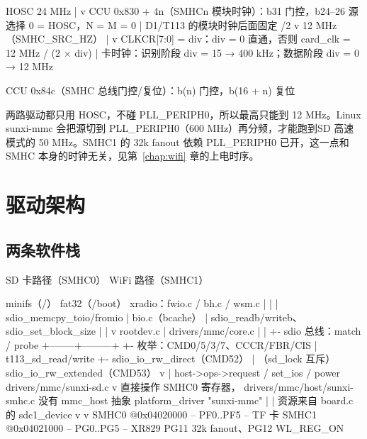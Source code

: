 \begin{txtcode}
HOSC 24 MHz
  |
  v  CCU 0x830 + 4n（SMHCn 模块时钟）：b31 门控，b24–26 源选择 0 = HOSC，N = M = 0
  |  D1/T113 的模块时钟后面固定 /2
  v
12 MHz（SMHC_SRC_HZ）
  |
  v  CLKCR[7:0] = div：div = 0 直通，否则 card_clk = 12 MHz / (2 × div)
  |
卡时钟：识别阶段 div = 15 → 400 kHz；数据阶段 div = 0 → 12 MHz

CCU 0x84c（SMHC 总线门控/复位）：b(n) 门控，b(16 + n) 复位
\end{txtcode}

两路驱动都只用 HOSC，不碰 PLL\_PERIPH0，所以最高只能到 12 MHz。Linux sunxi-mmc 会把源切到 PLL\_PERIPH0（600 MHz）再分频，才能跑到SD 高速模式的 50 MHz。SMHC1 的 32k fanout 依赖 PLL\_PERIPH0 已开，这一点和SMHC 本身的时钟无关，见第~\ref{chap:wifi} 章的上电时序。

\section{驱动架构}

\subsection{两条软件栈}

\begin{txtcode}[basicstyle=\ttfamily\scriptsize]
        SD 卡路径（SMHC0）                              WiFi 路径（SMHC1）

  minifs（/）        fat32（/boot）                xradio：fwio.c / bh.c / wsm.c
      |                  |                              | sdio_memcpy_toio/fromio
      |                bio.c（bcache）                  | sdio_readb/writeb、sdio_set_block_size
      |                  |                              v
  rootdev.c              |                    drivers/mmc/core.c
      |                  |                     +- sdio 总线：match / probe
      +--------+---------+                     +- 枚举：CMD0/5/3/7、CCCR/FBR/CIS
               | t113_sd_read/write            +- sdio_io_rw_direct（CMD52）
               | （sd_lock 互斥）                 sdio_io_rw_extended（CMD53）
               v                                        | host->ops->request / set_ios / power
  drivers/mmc/sunxi-sd.c                                v
   直接操作 SMHC0 寄存器，                    drivers/mmc/host/sunxi-smhc.c
   没有 mmc_host 抽象                          platform_driver "sunxi-mmc"
               |                                        | 资源来自 board.c 的 sdc1_device
               v                                        v
  SMHC0 @0x04020000 -- PF0..PF5 -- TF 卡      SMHC1 @0x04021000 -- PG0..PG5 -- XR829
                                                  PG11 32k fanout、PG12 WL_REG_ON
\end{txtcode}

